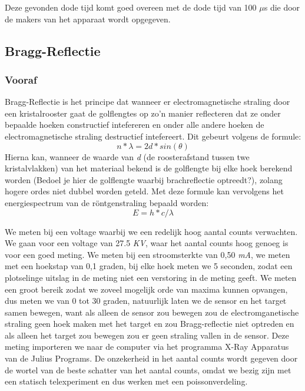 \documentclass[a4paper]{article}
\begin{document}
 Deze gevonden dode tijd komt  goed overeen met de dode tijd van 100 $\mu$s die door de makers van het apparaat wordt opgegeven. 
 \subsection{Bragg-Reflectie}
 \subsubsection{Vooraf}
 Bragg-Reflectie is het principe dat wanneer er electromagnetische straling door een kristalrooster gaat de golflengtes op zo'n manier reflecteren dat ze onder bepaalde hoeken constructief intefereren en onder alle andere hoeken de electromagnetische straling destructief intefereert. Dit gebeurt volgens de formule:
 \begin{equation}
 n*\lambda=2d*sin(\theta)
 \end{equation}
 Hierna kan, wanneer de waarde van \textit{d} (de roosterafstand tussen twe kristalvlakken) van het materiaal bekend is de golflengte bij elke hoek berekend worden {\color{red}(Bedoel je hier de golflengte waarbij brachreflectie optreedt?)}, zolang hogere ordes niet dubbel worden geteld. Met deze formule kan vervolgens het energiespectrum van de r\"{o}ntgenstraling bepaald worden:  
 \begin{equation}
 E=h*c/\lambda
\end{equation}
 
 
 We meten bij een voltage waarbij we een redelijk hoog aantal counts verwachten. We gaan voor een voltage van 27.5 \textit{KV}, waar het aantal counts hoog genoeg is voor een goed meting. We meten bij een stroomsterkte van 0,50 \textit{mA}, we meten met een hoekstap van 0,1 graden, bij elke hoek meten we 5 seconden, zodat een plotselinge uitslag in de meting niet een verstoring in de meting geeft. We meten een groot bereik zodat we zoveel mogelijk orde van maxima kunnen opvangen, dus meten we van 0 tot 30 graden, natuurlijk laten we de sensor en het target samen bewegen, want als alleen de sensor zou bewegen zou de electromganetische straling geen hoek maken met het target en zou Bragg-reflectie niet optreden en als alleen het target zou bewegen zou er geen straling vallen in de sensor. Deze meting importeren we naar de computer via het programma X-Ray Apparatus van de Julius Programs. De onzekerheid in het aantal counts wordt gegeven door de wortel van de beste schatter van het aantal counts, omdat we bezig zijn met een statisch telexperiment en dus werken met een poissonverdeling.\\
\end{document}
